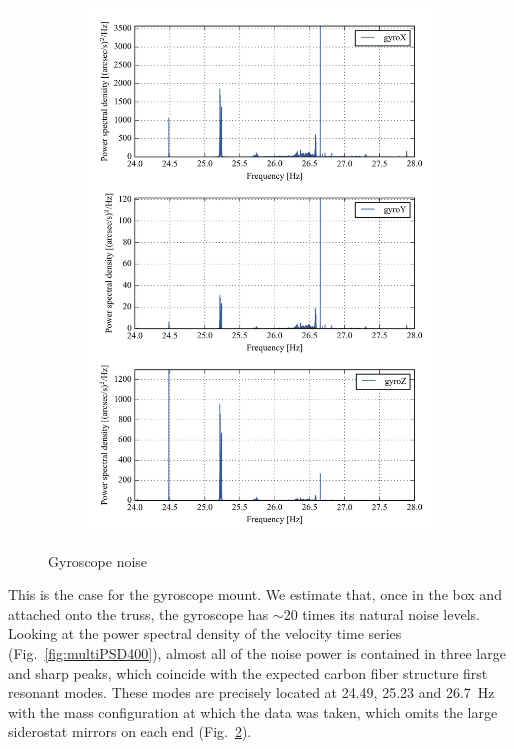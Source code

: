 \begin{landscape}
\begin{figure}[!h]
\begin{subfigure}[b]{0.7\textwidth}
\includegraphics[width=\textwidth]{Figures/multiPSD_no_loglog_zoom_400.png}
\label{fig:multiPSD400_no_loglog_zoom_400}
\vspace{-0.5cm}
\caption{}
	\end{subfigure}
	\vspace{-0.5cm}
\caption[Gyroscope noise]{Gyroscope noise}
\end{figure}
\end{landscape}



This is the case for the gyroscope mount. We estimate that, once in the box and attached onto the truss, the gyroscope has $\sim$20 times its natural noise levels. Looking at the power spectral density of the velocity time series (Fig.~\ref{fig:multiPSD400}), almost all of the noise power is contained in three large and sharp peaks, which coincide with the expected carbon fiber structure first resonant modes. These modes are precisely located at 24.49, 25.23 and \SI{26.7}{\hertz} with the mass configuration at which the data was taken, which omits the large siderostat mirrors on each end (Fig.~\ref{fig:multiPSD400_no_loglog_zoom_400}).

